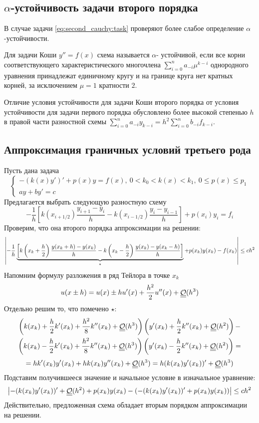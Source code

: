 \subsection*{$\alpha$-устойчивость задачи второго порядка}

В случае задачи \eqref{eq:second_cauchy:task} проверяют
более слабое определение $\alpha$-устойчивости.

\begin{definition}
  Для задачи Коши $y''=f(x)$ схема называется $\alpha$-
  устойчивой, если все корни соответствующего характеристического
  многочлена $\sum_{i=0}^na_{-i}\mu^{k-i}$ однородного уравнения
  принадлежат единичному кругу и на границе круга нет кратных корней, за
  исключением $\mu=1$ кратности $2$.
\end{definition}

Отличие условия устойчивости для задачи Коши второго порядка
от условия устойчивости для задачи первого порядка обусловлено
более высокой степенью $h$ в правой части разностной схемы $\sum_{i=0}^na_{-i}y_{k-i}=h^2\sum_{i=0}^nb_{-i}f_{k-i}$.

\subsection*{Аппроксимация граничных условий третьего рода}
Пусть дана задача
\[\begin{cases}
    -(k(x)y')'+p(x)y=f(x),\ 0<k_0<k(x)<k_1,\ 0\leq p(x)\leq p_1 \\
    ay+by'=c
  \end{cases}\]
Предлагается выбрать следующую разностную схему
\[-\frac{1}{h}\left[k(x_{i+1/2})\frac{y_{i+1}-y_i}{h}-k(x_{i-1/2})\frac{y_{i}-y_{i-1}}{h}\right]+p(x_i)y_i=f_i\]
Проверим, что она второго порядка аппроксимации на решении:
\[\left\lvert-\frac{1}{h}\underbrace{\left[k\left(x_k+\frac{h}{2}\right)\frac{y(x_k+h)-y(x_k)}{h}-k\left(x_k-\frac{h}{2}\right)\frac{y(x_k)-y(x_k-h)}{h}\right]}_{\star}+p(x_k)y(x_k)-f(x_k)\right\rvert\leq ch^2\]
Напомним формулу разложения в ряд Тейлора в точке $x_k$
\[u(x\pm h)=u(x)\pm hu'(x)+\frac{h^2}{2}u''(x)+\underline{\underline{\mathcal{O}}}(h^3)\]
Отдельно решим то, что помечено $\star$:
\begin{multline*}
  \left(k(x_k)+\frac{h}{2}k'(x_k)+\frac{h^2}{8}k''(x_k)+\underline{\underline{\mathcal{O}}}(h^3)\right)\left(y'(x_k)+\frac{h}{2}k''(x_k)+\underline{\underline{\mathcal{O}}}(h^2)\right)- \\
  \left(k(x_k)-\frac{h}{2}k'(x_k)+\frac{h^2}{8}k''(x_k)+\underline{\underline{\mathcal{O}}}(h^3)\right)\left(y'(x_k)-\frac{h}{2}k''(x_k)+\underline{\underline{\mathcal{O}}}(h^2)\right)=
\end{multline*}
\[=hk'(x_k)y'(x_k)+hk(x_k)y''(x_k)+\underline{\underline{\mathcal{O}}}(h^3)=h(k(x_k)y'(x_k))'+\underline{\underline{\mathcal{O}}}(h^3)\]
Подставим получившееся значение и начальное условие в изначальное уравнение:
\[\left\lvert-(k(x_k)y'(x_k))'+\underline{\underline{\mathcal{O}}}(h^2)+p(x_k)y(x_k)-(-(k(x_k)y'(x_k))'+p(x_k)y(x_k))\right\rvert\leq ch^2\]
Действительно, предложенная схема обладает вторым порядком аппроксимации на решении.

